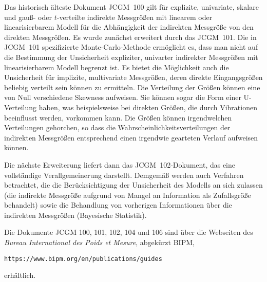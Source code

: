 Das historisch älteste Dokument JCGM~100 gilt für explizite, univariate, skalare und
gauß- oder $t$-verteilte indirekte Messgrößen mit linearem oder linearisierbarem Modell für die
Abhängigkeit der indirekten Messgröße von den direkten Messgrößen. Es wurde zunächst erweitert durch das JCGM~101. Die
in JCGM~101 spezifizierte Monte-Carlo-Methode ermöglicht es, dass man nicht auf die Bestimmung der Unsicherheit
expliziter, univarter indirekter Messgrößen mit linearisierbarem Modell begrenzt ist.
Es bietet die Möglichkeit auch die Unsicherheit für implizite, multivariate Messgrößen,
deren direkte Eingangsgrößen beliebig verteilt sein können zu ermitteln. Die Verteilung der
Größen können eine von Null verschiedene Skewness aufweisen. Sie können sogar die Form einer
U-Verteilung haben, was beispielsweise bei direkten Größen, die durch Vibrationen beeinflusst
werden, vorkommen kann. Die Größen können irgendwelchen Verteilungen gehorchen, so dass die
Wahrscheinlichkeitsverteilungen der indirekten Messgrößen entsprechend einen
irgendwie gearteten Verlauf aufweisen können.

Die nächste Erweiterung liefert dann das JCGM~102-Dokument, das eine vollständige Verallgemeinerung
darstellt. Demgemäß werden auch Verfahren betrachtet, die die Berücksichtigung der Unsicherheit des Modells an sich
zulassen (die indirekte Messgröße aufgrund von Mangel an Information als Zufallsgröße behandelt)
sowie die Behandlung von vorherigen Informationen über die indirekten Messgrößen (Bayesische Statistik).

Die Dokumente JCGM 100, 101, 102, 104 und 106 sind über die Webseiten des
\textsl{Bureau International des Poids et Mesure}, abgekürzt BIPM,
\begin{verbatim}
https://www.bipm.org/en/publications/guides
\end{verbatim}
erhältlich.

